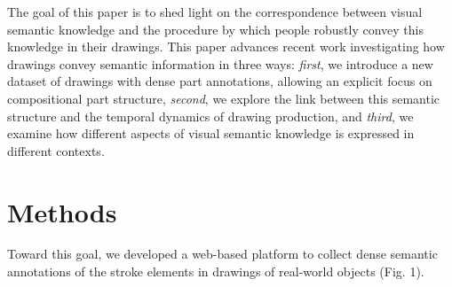 \documentclass[10pt,letterpaper]{article}
\begin{document}



The goal of this paper is to shed light on the correspondence between visual semantic knowledge and the procedure by which people robustly convey this knowledge in their drawings.
This paper advances recent work \cite{FanCommon2018} investigating how drawings convey semantic information in three ways: 
\textit{first}, we introduce a new dataset of drawings with dense part annotations, allowing an explicit focus on compositional part structure,
\textit{second}, we explore the link between this semantic structure and the temporal dynamics of drawing production,
and \textit{third}, we examine how different aspects of visual semantic knowledge is expressed in different contexts. 


\section{Methods}

Toward this goal, we developed a web-based platform \cite{deLeeuw2015} to collect dense semantic annotations of the stroke elements in drawings of real-world objects (Fig. 1).
\end{document}
